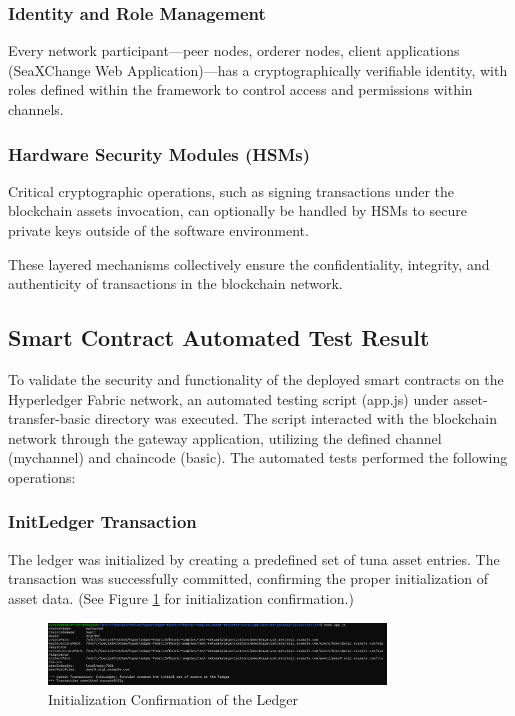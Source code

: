 \subsubsection{Identity and Role Management}
Every network participant—peer nodes, orderer nodes, client applications (SeaXChange Web Application)—has a cryptographically verifiable identity, with roles defined within the framework to control access and permissions within channels.

\subsubsection{Hardware Security Modules (HSMs)}
Critical cryptographic operations, such as signing transactions under the blockchain assets invocation, can optionally be handled by HSMs to secure private keys outside of the software environment.

These layered mechanisms collectively ensure the confidentiality, integrity, and authenticity of transactions in the blockchain network.

\subsection{Smart Contract Automated Test Result}
To validate the security and functionality of the deployed smart contracts on the Hyperledger Fabric network, an automated testing script (app.js) under asset-transfer-basic directory was executed. The script interacted with the blockchain network through the gateway application, utilizing the defined channel (mychannel) and chaincode (basic). The automated tests performed the following operations:

\subsubsection{InitLedger Transaction}
The ledger was initialized by creating a predefined set of tuna asset entries. The transaction was successfully committed, confirming the proper initialization of asset data.
(See Figure \ref{fig:initledger} for initialization confirmation.)

\begin{figure}[H]
	\centering
	\includegraphics[width=0.8\textwidth]{chaincode_security1.png} %
	\caption{Initialization Confirmation of the Ledger}
	\label{fig:initledger}
\end{figure}


